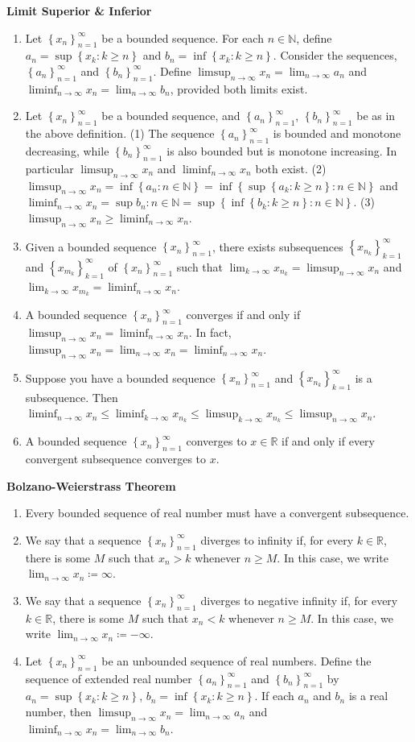 \documentclass[12pt]{article}
\newcommand{\set}[1]{\left\{ {#1} \right\}}
\newcommand{\limit}[1]{\displaystyle \lim_{ {#1} }}
\newcommand{\limtoinf}[1][n]{\displaystyle\lim_{ {#1} \to \infty}}
\newcommand{\liminftoinf}[1][n]{\displaystyle\liminf_{ {#1} \to \infty}}
\newcommand{\limsuptoinf}[1][n]{\displaystyle\limsup_{ {#1} \to \infty}}
\newcommand{\seq}[2][n]{\left\{ {#2} \right\}_{#1=1}^\infty}
\newcommand{\bR}{\mathbb{R}}
\newcommand{\bN}{\mathbb{N}}
\begin{document}
\noindent \textbf{Limit Superior \& Inferior}

\begin{enumerate}
	\item Let $\seq{x_n}$ be a bounded sequence. For each $n\in\bN$, define $a_n=\sup\set{x_k : k\ge n}$ and $b_n=\inf\set{x_k : k \ge n}$. Consider the sequences, $\seq{a_n}$ and $\seq{b_n}$. Define $\limsuptoinf x_n = \limtoinf a_n$ and $\liminftoinf x_n = \limtoinf b_n$, provided both limits exist.
	\item Let $\seq{x_n}$ be a bounded sequence, and $\seq{a_n}$, $\seq{b_n}$ be as in the above definition. (1) The sequence $\seq{a_n}$ is bounded and monotone decreasing, while $\seq{b_n}$ is also bounded but is monotone increasing. In particular $\limsuptoinf x_n$ and $\liminftoinf x_n$ both exist. (2)$\limsuptoinf x_n=\inf\set{a_n : n\in\bN}=\inf\set{\sup\set{a_k : k\ge n} : n\in\bN}$ and $\liminftoinf x_n = \sup{b_n : n\in\bN}=\sup\set{\inf\set{b_k : k\ge n} : n\in\bN}$. (3) $\limsuptoinf x_n\ge\liminftoinf x_n$.
	\item Given a bounded sequence $\seq{x_n}$, there exists subsequences $\seq[k]{x_{n_k}}$ and $\seq[k]{x_{m_k}}$ of $\seq{x_n}$ such that $\limit{k\to\infty} x_{n_k}=\limsuptoinf x_n$ and $\limit{k\to\infty} x_{m_k}=\liminftoinf x_n$.
	\item A bounded sequence $\seq{x_n}$ converges if and only if $\limsuptoinf x_n=\liminftoinf x_n$. In fact, $\limsuptoinf x_n=\limtoinf x_n=\liminftoinf x_n$.
	\item Suppose you have a bounded sequence $\seq{x_n}$ and $\seq[k]{x_{n_k}}$ is a subsequence. Then $\liminftoinf x_n\le\liminf_{k\to\infty} x_{n_k}\le\limsup_{k\to\infty} x_{n_k}\le\limsuptoinf x_n$.
	\item A bounded sequence $\seq{x_n}$ converges to $x\in\bR$ if and only if every convergent subsequence converges to $x$.
\end{enumerate}

\noindent \textbf{Bolzano-Weierstrass Theorem}

\begin{enumerate}
	\item Every bounded sequence of real number must have a convergent subsequence.
	\item We say that a sequence $\seq{x_n}$ diverges to infinity if, for every $k\in\bR$, there is some $M$ such that $x_n>k$ whenever $n\ge M$. In this case, we write $\limtoinf x_n\coloneq\infty$.
	\item We say that a sequence $\seq{x_n}$ diverges to negative infinity if, for every $k\in\bR$, there is some $M$ such that $x_n<k$ whenever $n\ge M$. In this case, we write $\limtoinf x_n\coloneq-\infty$.
	\item Let $\seq{x_n}$ be an unbounded sequence of real numbers. Define the sequence of extended real number $\seq{a_n}$ and $\seq{b_n}$ by $a_n=\sup\set{x_k : k\ge n}$, $b_n=\inf\set{x_k : k\ge n}$. If each $a_n$ and $b_n$ is a real number, then $\limsuptoinf x_n=\limtoinf a_n$ and $\liminftoinf x_n = \limtoinf b_n$.
\end{enumerate}
\end{document}
